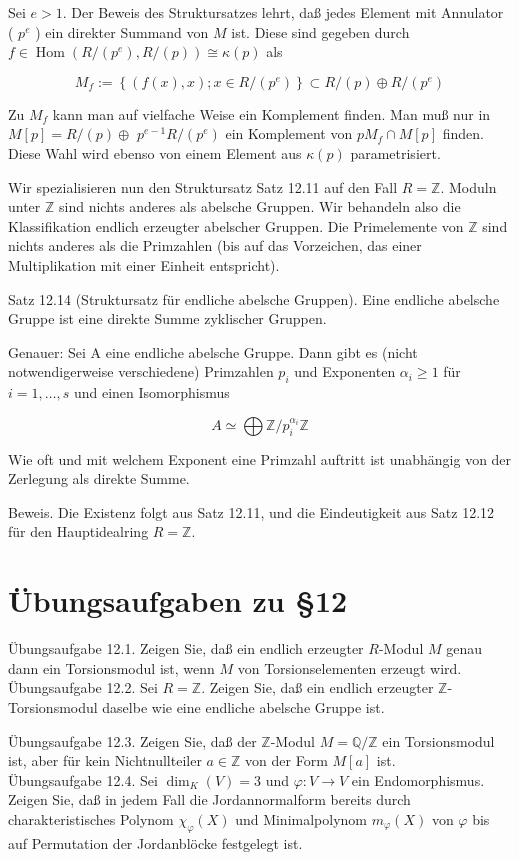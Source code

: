 \documentclass[10pt, letterpaper]{article}
\begin{document}
Sei $e>1$. Der Beweis des Struktursatzes lehrt, daß jedes Element mit Annulator ( $p^{e}$ ) ein direkter Summand von $M$ ist. Diese sind gegeben durch $f \in \operatorname{Hom}\left(R /\left(p^{e}\right), R /(p)\right) \cong \kappa(p)$ als

$$
M_{f}:=\left\{(f(x), x) ; x \in R /\left(p^{e}\right)\right\} \subset R /(p) \oplus R /\left(p^{e}\right)
$$

Zu $M_{f}$ kann man auf vielfache Weise ein Komplement finden. Man muß nur in $M[p]=R /(p) \oplus$ $p^{e-1} R /\left(p^{e}\right)$ ein Komplement von $p M_{f} \cap M[p]$ finden. Diese Wahl wird ebenso von einem Element aus $\kappa(p)$ parametrisiert.

Wir spezialisieren nun den Struktursatz Satz 12.11 auf den Fall $R=\mathbb{Z}$. Moduln unter $\mathbb{Z}$ sind nichts anderes als abelsche Gruppen. Wir behandeln also die Klassifikation endlich erzeugter abelscher Gruppen. Die Primelemente von $\mathbb{Z}$ sind nichts anderes als die Primzahlen (bis auf das Vorzeichen, das einer Multiplikation mit einer Einheit entspricht).

Satz 12.14 (Struktursatz für endliche abelsche Gruppen). Eine endliche abelsche Gruppe ist eine direkte Summe zyklischer Gruppen.

Genauer: Sei A eine endliche abelsche Gruppe. Dann gibt es (nicht notwendigerweise verschiedene) Primzahlen $p_{i}$ und Exponenten $\alpha_{i} \geq 1$ für $i=1, \ldots, s$ und einen Isomorphismus

$$
A \simeq \bigoplus \mathbb{Z} / p_{i}^{\alpha_{i}} \mathbb{Z}
$$

Wie oft und mit welchem Exponent eine Primzahl auftritt ist unabhängig von der Zerlegung als direkte Summe.

Beweis. Die Existenz folgt aus Satz 12.11, und die Eindeutigkeit aus Satz 12.12 für den Hauptidealring $R=\mathbb{Z}$.

\section*{Übungsaufgaben zu §12}
Übungsaufgabe 12.1. Zeigen Sie, daß ein endlich erzeugter $R$-Modul $M$ genau dann ein Torsionsmodul ist, wenn $M$ von Torsionselementen erzeugt wird.\\
Übungsaufgabe 12.2. Sei $R=\mathbb{Z}$. Zeigen Sie, daß ein endlich erzeugter $\mathbb{Z}$-Torsionsmodul daselbe wie eine endliche abelsche Gruppe ist.

Übungsaufgabe 12.3. Zeigen Sie, daß der $\mathbb{Z}$-Modul $M=\mathbb{Q} / \mathbb{Z}$ ein Torsionsmodul ist, aber für kein Nichtnullteiler $a \in \mathbb{Z}$ von der Form $M[a]$ ist.\\
Übungsaufgabe 12.4. Sei $\operatorname{dim}_{K}(V)=3$ und $\varphi: V \rightarrow V$ ein Endomorphismus. Zeigen Sie, daß in jedem Fall die Jordannormalform bereits durch charakteristisches Polynom $\chi_{\varphi}(X)$ und Minimalpolynom $m_{\varphi}(X)$ von $\varphi$ bis auf Permutation der Jordanblöcke festgelegt ist.
\end{document}
